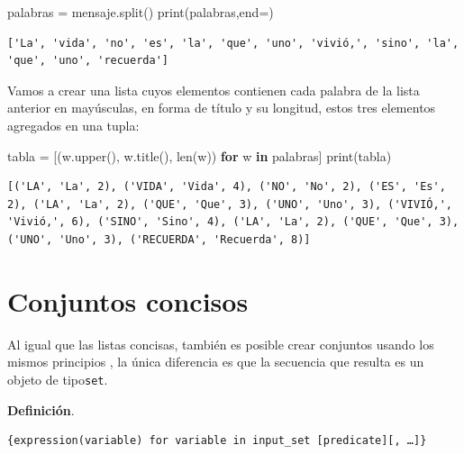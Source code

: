 \documentclass[
  spanish,
  letterpaper,
]{scrbook}
\newenvironment{Shaded}{\begin{snugshade}}{\end{snugshade}}
\newcommand{\BuiltInTok}[1]{\textcolor[rgb]{0.00,0.23,0.31}{#1}}
\newcommand{\ControlFlowTok}[1]{\textcolor[rgb]{0.00,0.23,0.31}{\textbf{#1}}}
\newcommand{\KeywordTok}[1]{\textcolor[rgb]{0.00,0.23,0.31}{\textbf{#1}}}
\newcommand{\NormalTok}[1]{\textcolor[rgb]{0.00,0.23,0.31}{#1}}
\newcommand{\OperatorTok}[1]{\textcolor[rgb]{0.37,0.37,0.37}{#1}}
\newcommand{\StringTok}[1]{\textcolor[rgb]{0.13,0.47,0.30}{#1}}
\theoremstyle{definition}
\theoremstyle{remark}
\begin{document}
\begin{Shaded}
\begin{Highlighting}[]
\NormalTok{palabras }\OperatorTok{=}\NormalTok{ mensaje.split()}
\BuiltInTok{print}\NormalTok{(palabras,end}\OperatorTok{=}\StringTok{\textquotesingle{}\textquotesingle{}}\NormalTok{)}
\end{Highlighting}
\end{Shaded}

\begin{verbatim}
['La', 'vida', 'no', 'es', 'la', 'que', 'uno', 'vivió,', 'sino', 'la', 'que', 'uno', 'recuerda']
\end{verbatim}

Vamos a crear una lista cuyos elementos contienen cada palabra de la
lista anterior en mayúsculas, en forma de título y su longitud, estos
tres elementos agregados en una tupla:

\begin{Shaded}
\begin{Highlighting}[]
\NormalTok{tabla }\OperatorTok{=}\NormalTok{ [(w.upper(), w.title(), }\BuiltInTok{len}\NormalTok{(w)) }\ControlFlowTok{for}\NormalTok{ w }\KeywordTok{in}\NormalTok{ palabras]}
\BuiltInTok{print}\NormalTok{(tabla)}
\end{Highlighting}
\end{Shaded}

\begin{verbatim}
[('LA', 'La', 2), ('VIDA', 'Vida', 4), ('NO', 'No', 2), ('ES', 'Es', 2), ('LA', 'La', 2), ('QUE', 'Que', 3), ('UNO', 'Uno', 3), ('VIVIÓ,', 'Vivió,', 6), ('SINO', 'Sino', 4), ('LA', 'La', 2), ('QUE', 'Que', 3), ('UNO', 'Uno', 3), ('RECUERDA', 'Recuerda', 8)]
\end{verbatim}

\section{Conjuntos concisos}\label{conjuntos-concisos}

Al igual que las listas concisas, también es posible crear conjuntos
usando los mismos principios , la única diferencia es que la secuencia
que resulta es un objeto de tipo\texttt{set}.

\textbf{Definición}.

\begin{verbatim}
{expression(variable) for variable in input_set [predicate][, …]}
\end{verbatim}
\end{document}
